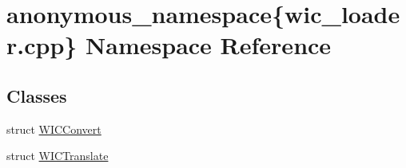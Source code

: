 \hypertarget{namespaceanonymous__namespace_02wic__loader_8cpp_03}{}\section{anonymous\+\_\+namespace\{wic\+\_\+loader.\+cpp\} Namespace Reference}
\label{namespaceanonymous__namespace_02wic__loader_8cpp_03}
\subsection*{Classes}
\begin{DoxyCompactItemize}
\item 
struct \mbox{\hyperlink{structanonymous__namespace_02wic__loader_8cpp_03_1_1_w_i_c_convert}{W\+I\+C\+Convert}}
\item 
struct \mbox{\hyperlink{structanonymous__namespace_02wic__loader_8cpp_03_1_1_w_i_c_translate}{W\+I\+C\+Translate}}
\end{DoxyCompactItemize}
